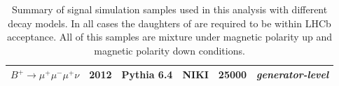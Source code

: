 \begin{table}[h!]
\begin{center}
\begin{tabular}{l l l l l l}
			$B^{+} \rightarrow \mu^{+} \mu^{-} \mu^{+} \nu$ & 2012 & Pythia 6.4\cite{pythia6} & NIKI & 25000 & \textit{generator-level}\\ %
%
			\hline
		\end{tabular}
	\end{center}
	\caption{Summary of signal simulation samples used in this analysis with different decay models. In all cases the daughters of \Bpm are required to be within \gls{LHCb} acceptance. All of this samples are mixture under magnetic polarity up and magnetic polarity down conditions. }
	\label{tab:MCPPass}
\end{table}



